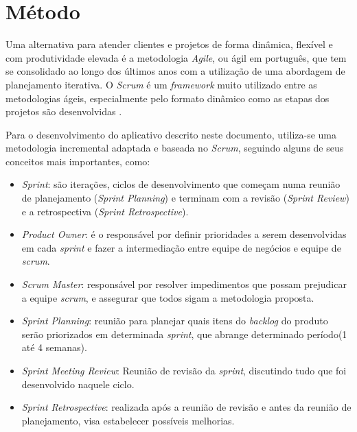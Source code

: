 \section{M\'etodo}

Uma alternativa para atender clientes e projetos de forma din\^amica, flex\'ivel e com produtividade elevada \'e a metodologia \textit{Agile}, ou \'agil em portugu\^es, que tem se consolidado ao longo dos \'ultimos anos com a utiliza\c{c}\~ao de uma abordagem de planejamento iterativa. O \textit{Scrum} \'e um \textit{framework} muito utilizado entre as metodologias \'ageis, especialmente pelo formato din\^amico como as etapas dos projetos s\~ao desenvolvidas \cite{Udacity2017}. 

Para o desenvolvimento do aplicativo descrito neste documento, utiliza-se uma metodologia incremental adaptada e baseada no \textit{Scrum}, seguindo alguns de seus conceitos mais importantes, como: 

\begin{itemize}
	
	\item \textit{Sprint}: s\~ao itera\c{c}\~oes, ciclos de desenvolvimento que come\c{c}am numa reuni\~ao de planejamento (\textit{Sprint Planning}) e terminam com a revis\~ao (\textit{Sprint Review}) e a retrospectiva (\textit{Sprint Retrospective}).
	
	\item \textit{Product Owner}: \'e o respons\'avel por definir prioridades a serem desenvolvidas em cada \textit{sprint} e fazer a intermedia\c{c}\~ao entre equipe de neg\'ocios e equipe de \textit{scrum}.
	
	\item \textit{Scrum Master}: respons\'avel por resolver impedimentos que possam prejudicar a equipe \textit{scrum}, e assegurar que todos sigam a metodologia proposta. 
	
	\item \textit{Sprint Planning}: reuni\~ao para planejar quais itens do \textit{backlog} do produto ser\~ao priorizados em determinada \textit{sprint}, que abrange determinado per\'iodo(1 at\'e 4 semanas).
	
	\item  \textit{Sprint Meeting Review}: Reuni\~ao de revis\~ao da \textit{sprint}, discutindo tudo que foi desenvolvido naquele ciclo. 
	
	\item \textit{Sprint Retrospective}: realizada ap\'os a reuni\~ao de revis\~ao e antes da reuni\~ao de planejamento, visa estabelecer poss\'iveis melhorias. 
		
\end{itemize}




